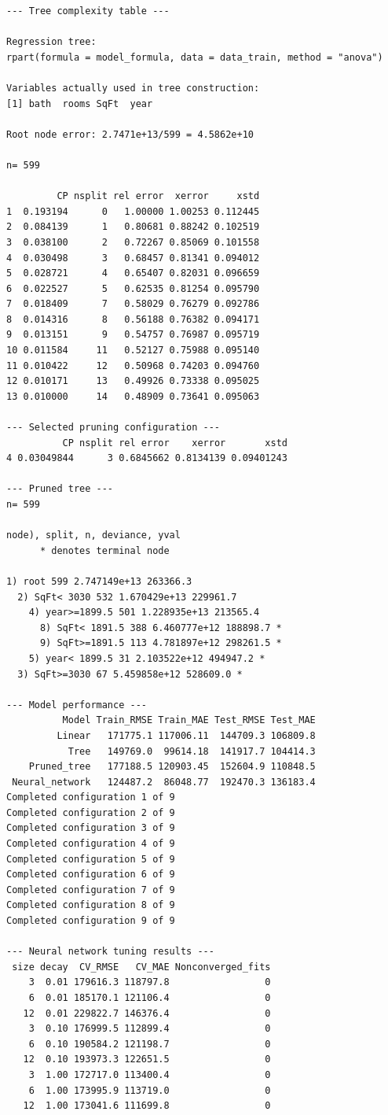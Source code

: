 \documentclass[11pt,a4paper]{article}
\begin{document}
\begin{lstlisting}[style=console]
--- Tree complexity table ---

Regression tree:
rpart(formula = model_formula, data = data_train, method = "anova")

Variables actually used in tree construction:
[1] bath  rooms SqFt  year 

Root node error: 2.7471e+13/599 = 4.5862e+10

n= 599 

         CP nsplit rel error  xerror     xstd
1  0.193194      0   1.00000 1.00253 0.112445
2  0.084139      1   0.80681 0.88242 0.102519
3  0.038100      2   0.72267 0.85069 0.101558
4  0.030498      3   0.68457 0.81341 0.094012
5  0.028721      4   0.65407 0.82031 0.096659
6  0.022527      5   0.62535 0.81254 0.095790
7  0.018409      7   0.58029 0.76279 0.092786
8  0.014316      8   0.56188 0.76382 0.094171
9  0.013151      9   0.54757 0.76987 0.095719
10 0.011584     11   0.52127 0.75988 0.095140
11 0.010422     12   0.50968 0.74203 0.094760
12 0.010171     13   0.49926 0.73338 0.095025
13 0.010000     14   0.48909 0.73641 0.095063

--- Selected pruning configuration ---
          CP nsplit rel error    xerror       xstd
4 0.03049844      3 0.6845662 0.8134139 0.09401243

--- Pruned tree ---
n= 599 

node), split, n, deviance, yval
      * denotes terminal node

1) root 599 2.747149e+13 263366.3  
  2) SqFt< 3030 532 1.670429e+13 229961.7  
    4) year>=1899.5 501 1.228935e+13 213565.4  
      8) SqFt< 1891.5 388 6.460777e+12 188898.7 *
      9) SqFt>=1891.5 113 4.781897e+12 298261.5 *
    5) year< 1899.5 31 2.103522e+12 494947.2 *
  3) SqFt>=3030 67 5.459858e+12 528609.0 *

--- Model performance ---
          Model Train_RMSE Train_MAE Test_RMSE Test_MAE
         Linear   171775.1 117006.11  144709.3 106809.8
           Tree   149769.0  99614.18  141917.7 104414.3
    Pruned_tree   177188.5 120903.45  152604.9 110848.5
 Neural_network   124487.2  86048.77  192470.3 136183.4
Completed configuration 1 of 9 
Completed configuration 2 of 9 
Completed configuration 3 of 9 
Completed configuration 4 of 9 
Completed configuration 5 of 9 
Completed configuration 6 of 9 
Completed configuration 7 of 9 
Completed configuration 8 of 9 
Completed configuration 9 of 9 

--- Neural network tuning results ---
 size decay  CV_RMSE   CV_MAE Nonconverged_fits
    3  0.01 179616.3 118797.8                 0
    6  0.01 185170.1 121106.4                 0
   12  0.01 229822.7 146376.4                 0
    3  0.10 176999.5 112899.4                 0
    6  0.10 190584.2 121198.7                 0
   12  0.10 193973.3 122651.5                 0
    3  1.00 172717.0 113400.4                 0
    6  1.00 173995.9 113719.0                 0
   12  1.00 173041.6 111699.8                 0


\end{lstlisting}
\end{document}
